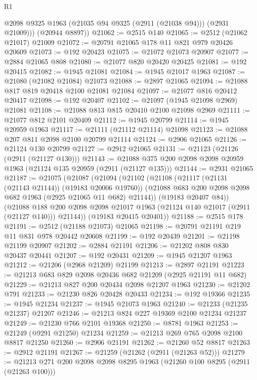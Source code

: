 \begin{lexlean}{R1}
\begin{coremodule}
          @2098
          @9325
          @1963
          (@21035 @94 @9325 (@2911 (@21038 @94)))
          (@2931 @21009)))
      (@20944 @8897))
@21062 := @2515 @140
@21065 := @2512 (@21062 @21017) @21009
@21072 := @20791 @21065 @178 @11 @821 @979 @20426 @20609
@21073 := @192 @20423
@21075 := @21072 @21073 @20907
@21077 := @2884 @21065 @808
@21080 := @21077 @820 @20420 @20425
@21081 := @192 @20415
@21082 := @1945 @21081
@21084 := @1945 @21017 @1963
@21087 := @21080 (@21082 @21084) @21073
@21088 := @2897 @21065
@21094 := @21088 @817 @819 @20418 @2100 @21081 @21084
@21097 := @21077 @816 @20412 @20417
@21098 := @192 @20407
@21102 := @21097 (@1945 @21098 @2969) @21081
@21108 := @21088 @813 @815 @20410 @2100 @21098 @2969
@21111 := @21077 @812 @2101 @20409
@21112 := @1945 @20799
@21114 := @1945 @20959 @1963
@21117 := @21111 (@21112 @21114) @21098
@21123 := @21088 @207 @811 @2098 @2100 @20799 @21114
@21124 := @2906 @21065
@21126 := @21124 @130 @20799
@21127 := @2912 @21065
@21131 := @21123 (@21126 (@2911 (@21127 @130)))
@21143 := @21088 @375 @200 @2098 @2098 @20959 @1963 (@21124 @135 @20959 (@2911 (@21127 @135)))
@21144 := @2931 @21065
@21187 := @21075
    (@21087
      (@21094
        (@21102
          (@21108
            (@21117 (@21131 (@21143 @21144)) (@19183 @20006 @19760))
            (@21088 @683 @200 @2098 @2098 @682 @1963 (@2925 @21065 @11 @682) @21144))
          (@19183 @20407 @84))
        (@21088
          @188
          @200
          @2098
          @2098
          @21017
          @1963
          (@21124 @140 @21017 (@2911 (@21127 @140)))
          @21144))
      (@19183 @20415 @20401))
@21188 := @2515 @178
@21191 := @2512 (@21188 @21073) @21065
@21198 := @20791 @21191 @219 @11 @831 @978 @20442 @20608
@21199 := @192 @20439
@21201 := @21198 @21199 @20907
@21202 := @2884 @21191
@21206 := @21202 @808 @830 @20437 @20441
@21207 := @192 @20431
@21209 := @1945 @21207 @1963
@21212 := @21206 (@2968 @21209) @21199
@21213 := @2897 @21191
@21223 := @21213 @683 @829 @2098 @20436 @682 @21209 (@2925 @21191 @11 @682)
@21229 := @21213 @827 @200 @20434 @2098 @21207 @1963
@21230 := @21202 @791
@21233 := @21230 @826 @20428 @20433
@21234 := @192 @19366
@21235 := @1945 @21234
@21237 := @1945 @21073 @1963
@21240 := @21233 (@21235 @21237) @21207
@21246 := @21213 @824 @227 @19369 @2100 @21234 @21237
@21249 := @21230 @766 @2101 @19368
@21250 := @8781 @1963
@21253 := @21249 (@9291 @21250) @21234
@21259 := @21213 @269 @765 @2098 @2100 @8817 @21250
@21260 := @2906 @21191
@21262 := @21260 @52 @8817
@21263 := @2912 @21191
@21267 := @21259 (@21262 (@2911 (@21263 @52)))
@21279 := @21213 @271 @200 @2098 @2098 @8295 @1963 (@21260 @100 @8295 (@2911 (@21263 @100)))

\end{coremodule}
\end{lexlean}
